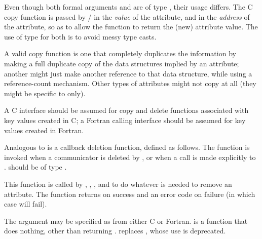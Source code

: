 \begin{users}
Even though both formal arguments  and
 are of type , their usage differs.
The C copy function is passed by \MPI/ in 
the \emph{value} of the attribute, and in
 the \emph{address} of the attribute, so as
to allow the function to return the (new) attribute value.
The use of type  for both is to avoid messy type casts.

A valid copy function is one that completely duplicates the
information by making a full duplicate copy of the data structures
implied by an attribute; another might just make another reference to
that data structure, while using a reference-count mechanism. Other
types of attributes might not copy at all (they might be specific to
 only).
\end{users}

\begin{implementors}
A C interface should be assumed for copy and delete functions
associated with key values created in C; a Fortran calling interface
should be assumed for key values created in Fortran.
\end{implementors}

Analogous to  is a callback deletion function, defined
as follows. The  function is invoked when a communicator is
deleted by ,  or when a call is made explicitly to
.
 should be
of type .

This function is called by ,
,
,
and 
to do whatever is needed to remove an attribute.
The function returns  on
success and an error code on failure (in which case
 will fail).

The argument  may be specified as\flushline %
from either C or Fortran.\flushline %
 is a function that does nothing, other
than returning . 
replaces , whose use is deprecated.

